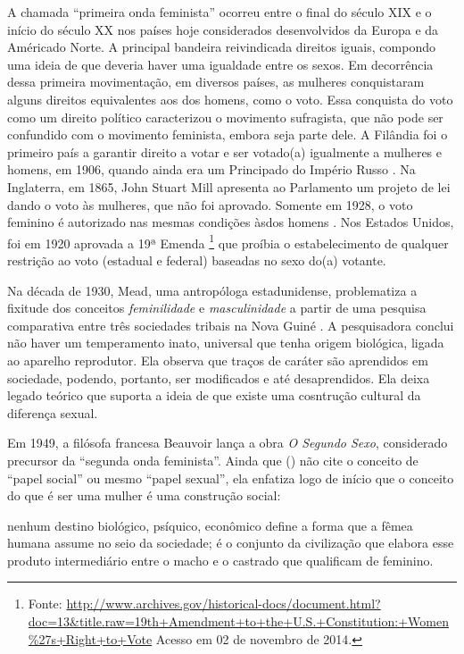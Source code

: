 A chamada ``primeira onda feminista'' ocorreu entre o final do século XIX e o início do século XX nos países hoje considerados desenvolvidos da Europa e da Américado Norte. A principal bandeira reivindicada direitos iguais, compondo uma ideia de que deveria haver uma igualdade entre os sexos. Em decorrência dessa primeira movimentação, em diversos países, as mulheres conquistaram alguns direitos equivalentes aos dos homens, como o voto. Essa conquista do voto como um direito político caracterizou o movimento sufragista, que não pode ser confundido com o movimento feminista, embora seja parte dele.
A Filândia foi o primeiro país a garantir direito a votar e ser votado(a) igualmente a mulheres e homens, em 1906, quando ainda era um Principado do Império Russo \cite{RAY1918}.
Na Inglaterra, em 1865, John Stuart Mill apresenta ao Parlamento um projeto de lei dando o voto às mulheres, que não foi aprovado. Somente em 1928, o voto feminino é autorizado nas mesmas condições àsdos homens \cite{NELSON2004}.
Nos Estados Unidos, foi em 1920 aprovada a 19ª Emenda
\footnote{Fonte: \url{http://www.archives.gov/historical-docs/document.html?doc=13&title.raw=19th+Amendment+to+the+U.S.+Constitution:+Women\%27s+Right+to+Vote} Acesso em 02 de novembro de 2014.} que proíbia o estabelecimento de qualquer restrição ao voto (estadual e federal) baseadas no sexo do(a) votante. 
 
Na década de 1930, Mead, uma antropóloga estadunidense, problematiza a fixitude dos conceitos \emph{feminilidade} e \emph{masculinidade} a partir de uma pesquisa comparativa entre três sociedades tribais na Nova Guiné  \cite{MEAD2000}. A pesquisadora conclui não haver um temperamento inato, universal que tenha origem biológica, ligada ao aparelho reprodutor. Ela observa que traços de caráter são aprendidos em sociedade, podendo, portanto, ser modificados e até desaprendidos. Ela deixa legado teórico que suporta a ideia de que existe uma cosntrução cultural da diferença sexual.

Em 1949, a filósofa francesa Beauvoir lança a obra \emph{O Segundo Sexo}, considerado precursor da ``segunda onda feminista''\cite{PISCITELLI2009}. Ainda que  (\citeyear{BEAUVOIR1967}) não cite o conceito de  ``papel social'' ou mesmo ``papel sexual'', ela enfatiza logo de início que o conceito do que é ser uma mulher é uma construção social:

\begin{citacao}
nenhum destino biológico, psíquico, econômico define a forma que a fêmea humana assume no seio da sociedade; é o conjunto da civilização que elabora esse produto intermediário entre o macho e o castrado que qualificam de feminino.
\cite[p.09]{BEAUVOIR1967}
\end{citacao}

